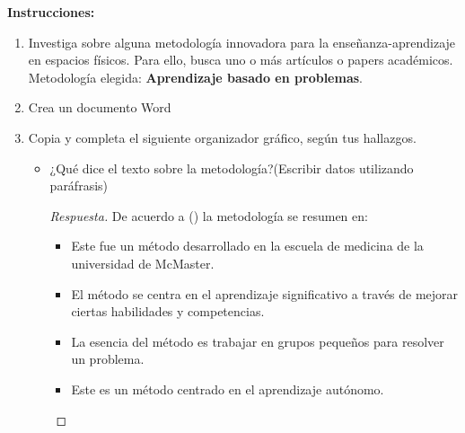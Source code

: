 





\textbf{Instrucciones:}
\begin{enumerate}
    \item Investiga sobre alguna metodología innovadora para la enseñanza-aprendizaje en espacios físicos. Para ello, busca uno o más artículos o papers académicos. Metodología elegida: \textbf{Aprendizaje basado en problemas}.
    
    \item Crea un documento Word
    
    \item Copia y completa el siguiente organizador gráfico, según tus hallazgos.
    \begin{itemize}
        \item ¿Qué dice el texto sobre la metodología?(Escribir datos utilizando
        paráfrasis)
        
        \begin{proof}[Respuesta]
            De acuerdo a \citeauthor{morales2004aprendizaje} (\citeyear{morales2004aprendizaje}) la metodología se resumen en: 
            \begin{itemize}
                \item Este fue un método desarrollado en la escuela de medicina de la universidad de McMaster. 
                \item El método se centra en el aprendizaje significativo a través de mejorar ciertas habilidades y competencias. 
                \item La esencia del método es trabajar en grupos pequeños para resolver un problema. 
                \item Este es un método centrado en el aprendizaje autónomo. 
            \end{itemize}
        \end{proof}
        

\end{itemize}
\end{enumerate}
